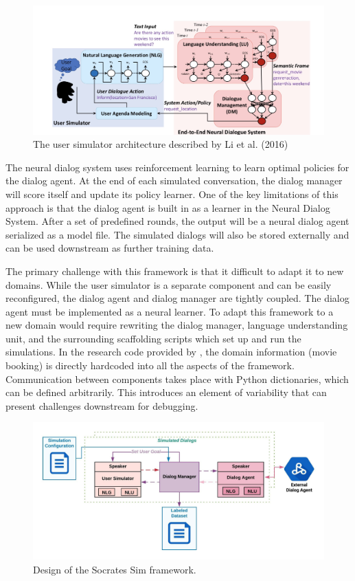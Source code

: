 \begin{figure}[h!]
	\label{fig:li_end_end}
	\includegraphics[width=\linewidth]{diagrams/li_end_to_end.jpeg}
	\caption{ The user simulator architecture described by Li et al. (2016) }
\end{figure}

The neural dialog system uses reinforcement learning to learn optimal policies for the dialog agent. At the end of each simulated conversation, the dialog manager will score itself and update its policy learner. One of the key limitations of this approach is that the dialog agent is built in as a learner in the Neural Dialog System. After a set of predefined rounds, the output will be a neural dialog agent serialized as a model file. The simulated dialogs will also be stored externally and can be used downstream as further training data.

The primary challenge with this framework is that it difficult to adapt it to new domains. While the user simulator is a separate component and can be easily reconfigured, the dialog agent and dialog manager are tightly coupled. The dialog agent must be implemented as a neural learner. To adapt this framework to a new domain would require rewriting the dialog manager, language understanding unit, and the surrounding scaffolding scripts which set up and run the simulations. In the research code provided by \cite{li_end_to_end}, the domain information (movie booking) is directly hardcoded into all the aspects of the framework. Communication between components takes place with Python dictionaries, which can be defined arbitrarily. This introduces an element of variability that can present challenges downstream for debugging.

\begin{figure}[h!]
	\label{fig:socrates_sim_framework}
	\includegraphics[width=\linewidth]{diagrams/socrates_diagram.jpeg}
	\caption{ Design of the Socrates Sim framework. }
\end{figure}

